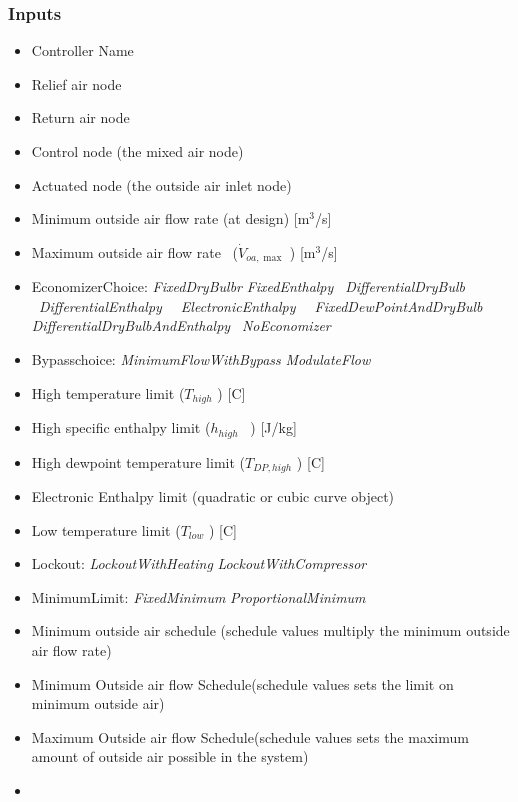 \subsubsection{Inputs}\label{inputs}

\begin{itemize}
\item
  Controller Name
\item
  Relief air node
\item
  Return air node
\item
  Control node (the mixed air node)
\item
  Actuated node (the outside air inlet node)
\item
  Minimum outside air flow rate (at design) {[}m\(^{3}\)/s{]}
\item
  Maximum outside air flow rate~ (\({\dot V_{oa,\max }}\) ) {[}m\(^{3}\)/s{]}
\item
  EconomizerChoice: \emph{FixedDryBulbr} \textbar{} \emph{FixedEnthalpy} \textbar{} \emph{~DifferentialDryBulb~} \textbar{} \emph{~DifferentialEnthalpy} \textbar{} \emph{~~ElectronicEnthalpy} \textbar{} \emph{~~FixedDewPointAndDryBulb~~~} \textbar{} \emph{DifferentialDryBulbAndEnthalpy~} \textbar{} \emph{NoEconomizer}
\item
  Bypasschoice: \emph{MinimumFlowWithBypass} \textbar{} \emph{ModulateFlow}
\item
  High temperature limit (\({T_{high}}\) ) {[}C{]}
\item
  High specific enthalpy limit (\({h_{high}}\) ~) {[}J/kg{]}
\item
  High dewpoint temperature limit (\({T_{DP,high}}\) ) {[}C{]}
\item
  Electronic Enthalpy limit (quadratic or cubic curve object)
\item
  Low temperature limit (\({T_{low}}\) ) {[}C{]}
\item
  Lockout: \emph{LockoutWithHeating} \textbar{} \emph{LockoutWithCompressor}
\item
  MinimumLimit: \emph{FixedMinimum} \textbar{} \emph{ProportionalMinimum}
\item
  Minimum outside air schedule (schedule values multiply the minimum outside air flow rate)
\item
  Minimum Outside air flow Schedule(schedule values sets the limit on minimum outside air)
\item
  Maximum Outside air flow Schedule(schedule values sets the maximum amount of outside air possible in the system)
\item

\end{itemize}
